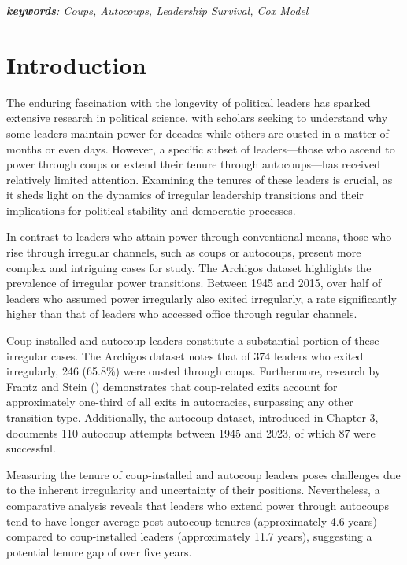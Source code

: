 \documentclass[
  12pt,
]{report}
\begin{document}
\emph{\textbf{keywords}: Coups, Autocoups, Leadership Survival, Cox
Model}

\newpage

\section{Introduction}\label{introduction-3}

The enduring fascination with the longevity of political leaders has
sparked extensive research in political science, with scholars seeking
to understand why some leaders maintain power for decades while others
are ousted in a matter of months or even days. However, a specific
subset of leaders---those who ascend to power through coups or extend
their tenure through autocoups---has received relatively limited
attention. Examining the tenures of these leaders is crucial, as it
sheds light on the dynamics of irregular leadership transitions and
their implications for political stability and democratic processes.

In contrast to leaders who attain power through conventional means,
those who rise through irregular channels, such as coups or autocoups,
present more complex and intriguing cases for study. The Archigos
dataset highlights the prevalence of irregular power transitions.
Between 1945 and 2015, over half of leaders who assumed power
irregularly also exited irregularly, a rate significantly higher than
that of leaders who accessed office through regular channels.

Coup-installed and autocoup leaders constitute a substantial portion of
these irregular cases. The Archigos dataset notes that of 374 leaders
who exited irregularly, 246 (65.8\%) were ousted through coups.
Furthermore, research by Frantz and Stein
() demonstrates that coup-related exits
account for approximately one-third of all exits in autocracies,
surpassing any other transition type. Additionally, the autocoup
dataset, introduced in \hyperref[sec-chapter3]{Chapter 3}, documents 110
autocoup attempts between 1945 and 2023, of which 87 were successful.

Measuring the tenure of coup-installed and autocoup leaders poses
challenges due to the inherent irregularity and uncertainty of their
positions. Nevertheless, a comparative analysis reveals that leaders who
extend power through autocoups tend to have longer average post-autocoup
tenures (approximately 4.6 years) compared to coup-installed leaders
(approximately 11.7 years), suggesting a potential tenure gap of over
five years.
\end{document}
